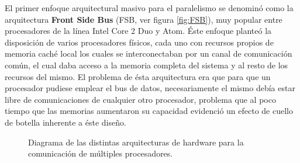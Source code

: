 El primer enfoque arquitectural masivo para el paralelismo se denominó como la arquitectura \textbf{Front Side Bus} (FSB, ver figura \ref{fig:FSB}), muy popular entre procesadores de la línea Intel Core 2 Duo y Atom. Éste enfoque planteó la disposición de varios procesadores físicos, cada uno con recursos propios de memoria caché local los cuales se interconectaban por un canal de comunicación común, el cual daba acceso a la memoria completa del sistema y al resto de los recursos del mismo. El problema de ésta arquitectura era que para que un procesador pudiese emplear el bus de datos, necesariamente el mismo debía estar libre de comunicaciones de cualquier otro procesador, problema que al poco tiempo que las memorias aumentaron su capacidad evidenció un efecto de cuello de botella inherente a éste diseño.

\begin{figure}[th!]
\centering
{}
\caption{Diagrama de las distintas arquitecturas de hardware para la comunicación de múltiples procesadores.}
\label{fig:arquitecturas}
\end{figure}

